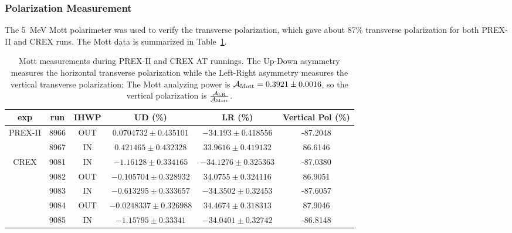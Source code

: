 \subsubsection{Polarization Measurement}
The 5~MeV Mott polarimeter was used to verify the transverse polarization,
which gave about 87\% transverse polarization for both PREX-II and CREX runs.
The Mott data is summarized in Table~\ref{tab:AT_Mott}.
\begin{table}[!h]
    \begin{tabular}{c c c | c c | c}
	\hline
	exp & run & IHWP  & UD (\%)	& LR (\%)   & Vertical Pol (\%)	\\
	\hline
	\multirow{2}{*}{PREX-II}
	    & 8966  & OUT   & $0.0704732 \pm 0.435101$	& $-34.193 \pm 0.418556$	& -87.2048  \\
	    & 8967  & IN    & $0.421465 \pm 0.432328$	& $33.9616 \pm 0.419132$	&  86.6146  \\
	\hline
	\multirow{5}{*}{CREX}    
	    & 9081  & IN    & $-1.16128 \pm 0.334165$   & $-34.1276 \pm 0.325363$	& -87.0380  \\
	    & 9082  & OUT   & $-0.105704 \pm 0.328932$	& $34.0755 \pm 0.324116	$&  86.9051  \\
	    & 9083  & IN    & $-0.613295 \pm 0.333657$	& $-34.3502 \pm 0.32453	$& -87.6057  \\
	    & 9084  & OUT   & $-0.0248337 \pm 0.326988$	& $34.4674 \pm 0.318313	$&  87.9046  \\
	    & 9085  & IN    & $-1.15795 \pm 0.33341 $   & $-34.0401 \pm 0.32742	$& -86.8148  \\
	\hline
    \end{tabular}
    \caption[Mott measurement during AT]
    {Mott measurements during PREX-II and CREX AT runnings. The Up-Down
    asymmetry measures the horizontal transverse polarization while the Left-Right
    asymmetry measures the vertical transverse polarization; The Mott analyzing 
    power is $\mathcal{A}_{\text{Mott}} = 0.3921 \pm 0.0016$, so the vertical polarization is 
    $\frac{\mathcal{A}_{\text{LR}}}{\mathcal{A}_{\text{Mott}}}$.} 
    \label{tab:AT_Mott}
\end{table}

